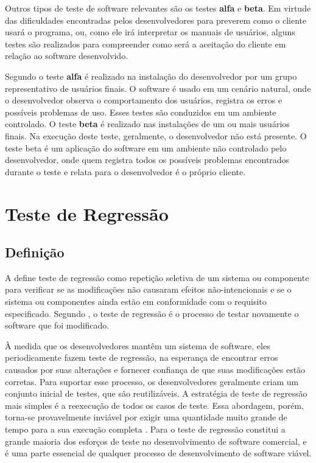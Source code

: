 Outros tipos de teste de software relevantes são os testes \textbf{alfa} e \textbf{beta}. Em virtude das dificuldades encontradas pelos desenvolvedores para preverem como o cliente usará o programa, ou, como ele irá interpretar os manuais de usuários, alguns testes são realizados para compreender como será a aceitação do cliente em relação ao software desenvolvido. 

Segundo  o teste \textbf{alfa} é realizado na instalação do desenvolvedor por um grupo representativo de usuários finais. O software é usado em um cenário natural, onde o desenvolvedor observa o comportamento dos usuários, registra os erros e possíveis problemas de uso. Esses testes são conduzidos em um ambiente controlado. O teste \textbf{beta} é realizado nas instalações de um ou mais usuários finais. Na execução deste teste, geralmente, o desenvolvedor não está presente. O teste beta é um aplicação do software em um ambiente não controlado pelo desenvolvedor, onde quem registra todos os possíveis problemas encontrados durante o teste e relata para o desenvolvedor é o próprio cliente.



\section{Teste de Regressão}\label{sec:testesregressao}

\subsection{Definição}

 A  define teste de regressão como repetição seletiva de um sistema ou componente para verificar se as modificações não causaram efeitos não-intencionais e se o sistema ou componentes ainda estão em conformidade com o requisito especificado. Segundo , o teste de regressão é o processo de testar novamente o software que foi modificado. 
 
 À medida que os desenvolvedores mantêm um sistema de software, eles periodicamente fazem teste de regressão, na esperança de encontrar erros causados por suas alterações e fornecer confiança de que suas modificações estão corretas. Para suportar esse processo, os desenvolvedores geralmente criam um conjunto inicial de testes, que são reutilizáveis. A estratégia de teste de regressão mais simples é a reexecução de todos os casos de teste. Essa abordagem, porém, torna-se provavelmente inviável por exigir uma quantidade muito grande de tempo para a sua execução completa \cite{Graves:2001:ESR:367008.367020}. Para  o teste de regressão constitui a grande maioria dos esforços de teste no desenvolvimento de software comercial, e é uma parte essencial de qualquer processo de desenvolvimento de software viável.
 
